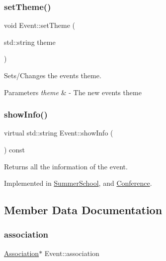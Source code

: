\subsubsection{\texorpdfstring{set\+Theme()}{setTheme()}}
{\footnotesize\ttfamily void Event\+::set\+Theme (\begin{DoxyParamCaption}\item[{std\+::string}]{theme }\end{DoxyParamCaption})}



Sets/\+Changes the event\textquotesingle{}s theme. 


\begin{DoxyParams}{Parameters}
{\em theme} & -\/ The new event\textquotesingle{}s theme \\
\hline
\end{DoxyParams}
\mbox{\label{classEvent_aaa38f467e933c57190d43351bdb817be}} 
\subsubsection{\texorpdfstring{show\+Info()}{showInfo()}}
{\footnotesize\ttfamily virtual std\+::string Event\+::show\+Info (\begin{DoxyParamCaption}{ }\end{DoxyParamCaption}) const\hspace{0.3cm}{\ttfamily [pure virtual]}}



Returns all the information of the event. 



Implemented in \hyperlink{classSummerSchool_a61ac7307840f787e3de639d431248e26}{Summer\+School}, and \hyperlink{classConference_a7a2f7b38c728f487d82356d3c671ef88}{Conference}.



\subsection{Member Data Documentation}
\mbox{\label{classEvent_a3c8694833e50dbd2e37943eff1f5c9b1}} 
\subsubsection{\texorpdfstring{association}{association}}
{\footnotesize\ttfamily \hyperlink{classAssociation}{Association}$\ast$ Event\+::association\hspace{0.3cm}{\ttfamily [protected]}}



